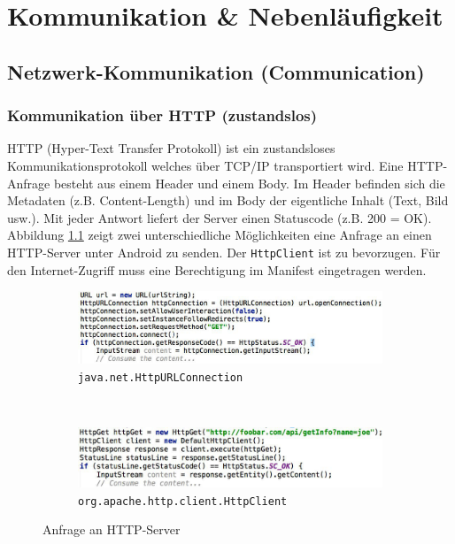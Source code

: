 \chapter{Kommunikation \& Nebenläufigkeit}

\section{Netzwerk-Kommunikation (Communication)}

\subsection{Kommunikation über HTTP (zustandslos)}

HTTP (Hyper-Text Transfer Protokoll) ist ein zustandsloses Kommunikationsprotokoll welches über TCP/IP transportiert wird. Eine HTTP-Anfrage besteht aus einem Header und einem Body. Im Header befinden sich die Metadaten (z.B. Content-Length) und im Body der eigentliche Inhalt (Text, Bild usw.). Mit jeder Antwort liefert der Server einen Statuscode (z.B. 200 = OK).
Abbildung \ref{fig:http-anfrage} zeigt zwei unterschiedliche Möglichkeiten eine Anfrage an einen HTTP-Server unter Android zu senden. Der \texttt{HttpClient} ist zu bevorzugen. Für den Internet-Zugriff muss eine Berechtigung im Manifest eingetragen werden.

\begin{figure}
	\centering
	\begin{subfigure}[b]{0.48\textwidth}
		\includegraphics[width=\textwidth]{fig/httpurlconnection}
		\caption{\texttt{java.net.HttpURLConnection}}
	\end{subfigure}
	~
	\begin{subfigure}[b]{0.48\textwidth}
		\includegraphics[width=\textwidth]{fig/httpclient}
		\caption{\texttt{org.apache.http.client.HttpClient}}
	\end{subfigure}
	\caption{Anfrage an HTTP-Server}
	\label{fig:http-anfrage}
\end{figure}

